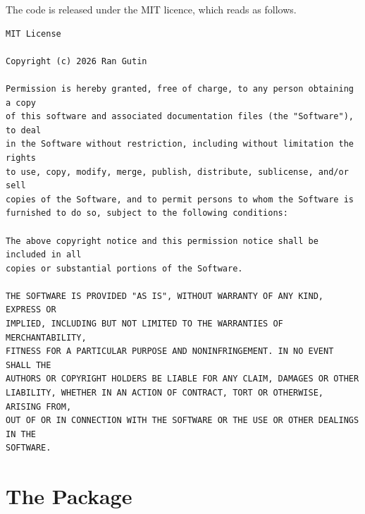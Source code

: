 \documentclass[12pt, a4paper]{report}
\theoremstyle{plain}
\theoremstyle{definition}
\theoremstyle{remark}
\theoremstyle{plain}
\begin{document}
The code is released under the MIT licence, which reads as follows.
\begin{lstlisting}[style=dsqtext]
MIT License

Copyright (c) 2026 Ran Gutin

Permission is hereby granted, free of charge, to any person obtaining a copy
of this software and associated documentation files (the "Software"), to deal
in the Software without restriction, including without limitation the rights
to use, copy, modify, merge, publish, distribute, sublicense, and/or sell
copies of the Software, and to permit persons to whom the Software is
furnished to do so, subject to the following conditions:

The above copyright notice and this permission notice shall be included in all
copies or substantial portions of the Software.

THE SOFTWARE IS PROVIDED "AS IS", WITHOUT WARRANTY OF ANY KIND, EXPRESS OR
IMPLIED, INCLUDING BUT NOT LIMITED TO THE WARRANTIES OF MERCHANTABILITY,
FITNESS FOR A PARTICULAR PURPOSE AND NONINFRINGEMENT. IN NO EVENT SHALL THE
AUTHORS OR COPYRIGHT HOLDERS BE LIABLE FOR ANY CLAIM, DAMAGES OR OTHER
LIABILITY, WHETHER IN AN ACTION OF CONTRACT, TORT OR OTHERWISE, ARISING FROM,
OUT OF OR IN CONNECTION WITH THE SOFTWARE OR THE USE OR OTHER DEALINGS IN THE
SOFTWARE.
\end{lstlisting}

\section{The Package}
\label{sec:code-package}
\end{document}
